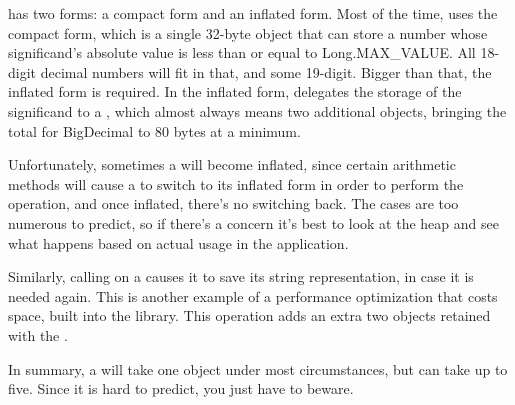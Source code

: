  has two forms: a compact form and an
inflated form. Most of the time,  uses the compact form,
which is a single 32-byte object that can store a number whose significand's
absolute value is less than or equal to Long.MAX_VALUE.  
All 18-digit decimal numbers will fit in that, and some 19-digit.  Bigger than
that, the inflated form is required. In the inflated form, 
delegates the storage of the significand to a , which almost always means two additional
objects, bringing the total for BigDecimal to 80 bytes at a minimum.

Unfortunately, sometimes a  will become
inflated, since certain arithmetic methods will cause a  to
switch to its inflated form in order to perform the operation, and once inflated,
there's no switching back.  The cases are too numerous to predict, so if there's
a concern it's best to look at the heap and see what happens based on actual usage in the 
application.

Similarly, calling  on a  causes it to
save its string representation, in case it is needed again.
This is another example of a performance optimization that 
costs space, built into the library.  This operation adds an extra two objects
retained with the . 

In summary, a  will take one
object under most circumstances, but can take up to five. Since it is hard to
predict, you just have to beware.

